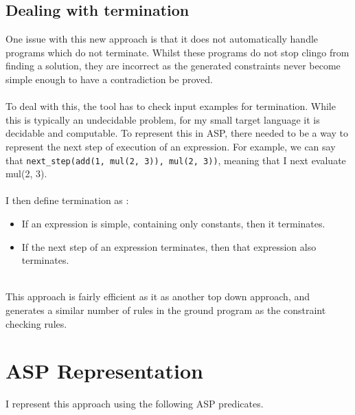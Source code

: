 \subsection{Dealing with termination}
One issue with this new approach is that it does not automatically handle programs which do not terminate. Whilst these programs do not stop clingo from finding a solution, they are incorrect as the generated constraints never become simple enough to have a contradiction be proved. \\ \\
To deal with this, the tool has to check input examples for termination. While this is typically an undecidable problem, for my small target language it is decidable and computable. To represent this in ASP, there needed to be a way to represent the next step of execution of an expression. For example, we can say that \lstinline{next_step(add(1, mul(2, 3)), mul(2, 3))}, meaning that I next evaluate mul(2, 3). \\ \\%
I then define termination as :
\begin{itemize}
\item If an expression is simple, containing only constants, then it terminates.
\item If the next step of an expression terminates, then that expression also terminates.
\end{itemize}
\mbox{}\\
This approach is fairly efficient as it as another top down approach, and generates a similar number of rules in the ground program as the constraint checking rules.
\mbox{}\\
\section{ASP Representation}
I represent this approach using the following ASP predicates.

